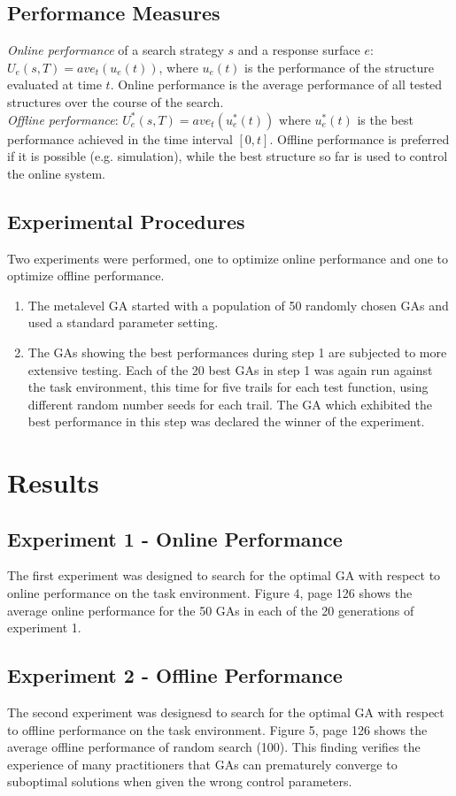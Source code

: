 \documentclass[12pt]{book}
\begin{document}
\subsection{Performance Measures}
\textit{Online performance} of a search strategy $s$ and a response surface $e$: $U_e(s,T) = ave_t(u_e(t))$, where $u_e(t)$ is the performance of the structure evaluated at time $t$. Online performance is the average performance of all tested structures over the course of the search.\\
\textit{Offline performance}: $U_e^*(s,T) = ave_t(u_e^*(t))$ where $u_e^*(t)$ is the best performance achieved in the time interval $[0,t]$. Offline performance is preferred if it is possible (e.g. simulation), while the best structure so far is used to control the online system.

\subsection{Experimental Procedures}
Two experiments were performed, one to optimize online performance and one to optimize offline performance.
\begin{enumerate}
\item The metalevel GA started with a population of 50 randomly chosen GAs and used a standard parameter setting.
\item The GAs showing the best performances during step 1 are subjected to more extensive testing. Each of the 20 best GAs in step 1 was again run against the task environment, this time for five trails for each test function, using different random number seeds for each trail. The GA which exhibited the best performance in this step was declared the winner of the experiment.
\end{enumerate}

\section{Results}
\subsection{Experiment 1 - Online Performance}
The first experiment was designed to search for the optimal GA with respect to online performance on the task environment. Figure 4, page 126 shows the average online performance for the 50 GAs in each of the 20 generations of experiment 1.

\subsection{Experiment 2 - Offline Performance}
The second experiment was designesd to search for the optimal GA with respect to offline performance on the task environment. Figure 5, page 126 shows the average offline performance of random search (100). This finding verifies the experience of many practitioners that GAs can prematurely converge to suboptimal solutions when given the wrong control parameters.
\end{document}
